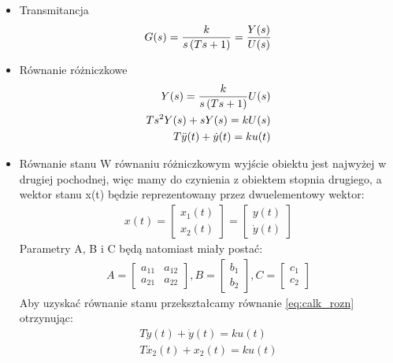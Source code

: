 \documentclass[a4paper,10pt]{article}
\begin{document}
\begin{itemize}
\begin{itemize}
\item Transmitancja	
	\begin{eqnarray}
		G(s)= {k \over {s \left( Ts + 1 \right) }} = {Y(s) \over U(s)}
	\end{eqnarray}
\item Równanie różniczkowe
	\begin{eqnarray} 
		\nonumber Y(s) = {k \over {s \left( Ts + 1 \right) }} U(s)\\ 
		\nonumber Ts^{2}Y(s) + sY(s) = kU(s)\\
		T\ddot{y}(t) + \dot{y}(t) = ku(t) \label{eq:calk_rozn}
	\end{eqnarray}
\item Równanie stanu
\newline W równaniu różniczkowym wyjście obiektu jest najwyżej w drugiej pochodnej, więc mamy do czynienia z obiektem stopnia drugiego, a wektor stanu x(t) będzie reprezentowany przez dwuelementowy wektor:
 	\begin{eqnarray}
		\nonumber x(t) = \left[ 
			\begin{array}{l}
				x_{1}(t)\\
				x_{2}(t)
			\end{array}
		\right] = \left[ 
			\begin{array}{l}
				y(t)\\
				\dot{y}(t)
			\end{array}
		\right]
	\end{eqnarray}
Parametry A, B i C będą natomiast miały postać:
	\begin{eqnarray}
		\nonumber A = \left[ 
			\begin{array}{ll}
				a_{11} & a_{12}\\
				a_{21} & a_{22}
			\end{array}
		\right], B = \left[ 
			\begin{array}{l}
				b_{1}\\
				b_{2}
			\end{array}
		\right], C = \left[ 
			\begin{array}{l}
				c_{1}\\
				c_{2}
			\end{array}
		\right]
	\end{eqnarray}
Aby uzyskać równanie stanu przekształcamy równanie \ref{eq:calk_rozn} otrzynując:
	\begin{eqnarray}
		\nonumber T\ddot{y}(t) + \dot{y}(t) = ku(t)\\
		\nonumber T\dot{x_{2}}(t) + x_{2}(t) = ku(t)\\

\end{eqnarray}
\end{itemize}
\end{itemize}
\end{document}
